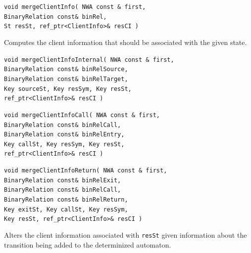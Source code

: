 \begin{description}

  \item\texttt{void mergeClientInfo( NWA const \& first,\\ \hspace*{3.25cm}
    BinaryRelation const\& binRel,\\ \hspace*{3.25cm} St resSt,
    ref\_ptr<ClientInfo>\& resCI )} \nopagebreak

    Computes the client information that should be associated with the given state.

  \item\texttt{void mergeClientInfoInternal( NWA const \& first,\nopagebreak
    \\ \hspace*{3.25cm} BinaryRelation const\& binRelSource,\nopagebreak
    \\ \hspace*{3.25cm} BinaryRelation const\& binRelTarget, \nopagebreak
    \\ \hspace*{3.25cm} Key sourceSt, Key resSym, Key resSt, \nopagebreak
    \\ \hspace*{3.25cm} ref\_ptr<ClientInfo>\& resCI )} \nopagebreak
  \item\texttt{void mergeClientInfoCall( NWA const \&
    first,\\ \hspace*{3.25cm} BinaryRelation const\&
    binRelCall,\\ \hspace*{3.25cm} BinaryRelation const\&
    binRelEntry,\\ \hspace*{3.25cm} Key callSt, Key resSym, Key
    resSt,\\ \hspace*{3.25cm} ref\_ptr<ClientInfo>\& resCI )} \nopagebreak
  \item\texttt{void mergeClientInfoReturn( NWA const \&
    first,\\ \hspace*{3.25cm} BinaryRelation const\&
    binRelExit,\\ \hspace*{3.25cm} BinaryRelation const\&
    binRelCall,\\ \hspace*{3.25cm} BinaryRelation const\&
    binRelReturn,\\ \hspace*{3.25cm} Key exitSt, Key callSt, Key
    resSym,\\ \hspace*{3.25cm} Key resSt, ref\_ptr<ClientInfo>\& resCI )}
    \nopagebreak

    Alters the client information associated with \texttt{resSt} given
    information about the transition being added to the determinized
    automaton.

\end{description}

